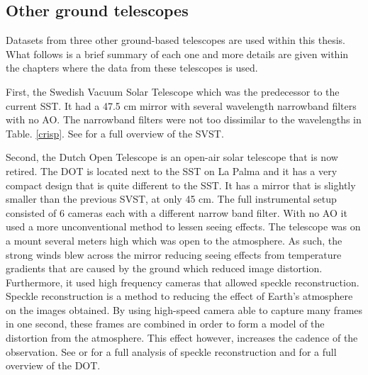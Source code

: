 \subsection{Other ground telescopes}

	Datasets from three other ground-based telescopes are used within this thesis.
	What follows is a brief summary of each one and more details are given within the chapters where the data from these telescopes is used.
    
	First, the Swedish Vacuum Solar Telescope which was the predecessor to the current SST.
	It had a 47.5 cm mirror with several wavelength narrowband filters with no AO.
    The narrowband filters were not too dissimilar to the wavelengths in Table. \ref{crisp}.
    See \cite{1991AdSpR..11..129S} for a full overview of the SVST.

	Second, the Dutch Open Telescope is an open-air solar telescope that is now retired. 
	The DOT is located next to the SST on La Palma and it has a very compact design that is quite different to the SST.
    It has a mirror that is slightly smaller than the previous SVST, at only 45 cm.
    The full instrumental setup consisted of 6 cameras each with a different narrow band filter.
	With no AO it used a more unconventional method to lessen seeing effects.
	The telescope was on a mount several meters high which was open to the atmosphere.
    As such, the strong winds blew across the mirror reducing seeing effects from temperature gradients that are caused by the ground which reduced image distortion.
    Furthermore, it used high frequency cameras that allowed speckle reconstruction.
    Speckle reconstruction is a method to reducing the effect of Earth's atmosphere on the images obtained.
    By using high-speed camera able to capture many frames in one second, these frames are combined in order to form a model of the distortion from the atmosphere. 
    This effect however, increases the cadence of the observation.
    See \cite{1992A&A...261..321K} or \cite{20764} for a full analysis of speckle reconstruction and \cite{rutten} for a full overview of the DOT.
    
